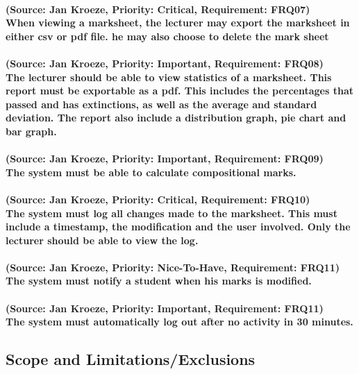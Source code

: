 \documentclass[12pt]{article}
\begin{document}
  \paragraph{ (Source: Jan Kroeze, Priority: Critical, Requirement: FRQ07) \\
  When viewing a marksheet, the lecturer may export the marksheet in either csv or pdf file. he may also choose to delete the mark sheet}
  \paragraph{ (Source: Jan Kroeze, Priority: Important, Requirement: FRQ08) \\
  The lecturer should be able to view statistics of a marksheet.  This report must be exportable as a pdf. This includes the percentages that passed and has extinctions, as well as the average and standard deviation. The report also include a distribution graph, pie chart and bar graph.}
  \paragraph{ (Source: Jan Kroeze, Priority: Important, Requirement: FRQ09) \\
  The system must be able to calculate compositional marks.}
  \paragraph{ (Source: Jan Kroeze, Priority: Critical, Requirement: FRQ10) \\
  The system must log all changes made to the marksheet. This must include a timestamp, the modification and the user involved. Only the lecturer should be able to view the log.}
  \paragraph{ (Source: Jan Kroeze, Priority: Nice-To-Have, Requirement: FRQ11) \\
  The system must notify a student when his marks is modified.}
  \paragraph{ (Source: Jan Kroeze, Priority: Important, Requirement: FRQ11) \\
  The system must automatically log out after no activity in 30 minutes.}
  \subsection{Scope and Limitations/Exclusions}
\end{document}
